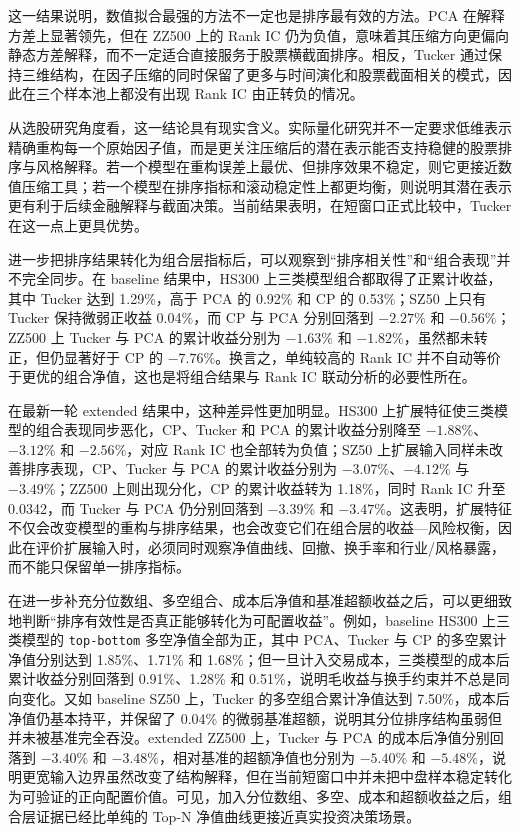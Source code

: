 这一结果说明，数值拟合最强的方法不一定也是排序最有效的方法。PCA 在解释方差上显著领先，但在 ZZ500 上的 Rank IC 仍为负值，意味着其压缩方向更偏向静态方差解释，而不一定适合直接服务于股票横截面排序。相反，Tucker 通过保持三维结构，在因子压缩的同时保留了更多与时间演化和股票截面相关的模式，因此在三个样本池上都没有出现 Rank IC 由正转负的情况。

从选股研究角度看，这一结论具有现实含义。实际量化研究并不一定要求低维表示精确重构每一个原始因子值，而是更关注压缩后的潜在表示能否支持稳健的股票排序与风格解释。若一个模型在重构误差上最优、但排序效果不稳定，则它更接近数值压缩工具；若一个模型在排序指标和滚动稳定性上都更均衡，则说明其潜在表示更有利于后续金融解释与截面决策。当前结果表明，在短窗口正式比较中，Tucker 在这一点上更具优势。

进一步把排序结果转化为组合层指标后，可以观察到“排序相关性”和“组合表现”并不完全同步。在 baseline 结果中，HS300 上三类模型组合都取得了正累计收益，其中 Tucker 达到 1.29\%，高于 PCA 的 0.92\% 和 CP 的 0.53\%；SZ50 上只有 Tucker 保持微弱正收益 0.04\%，而 CP 与 PCA 分别回落到 $-2.27\%$ 和 $-0.56\%$；ZZ500 上 Tucker 与 PCA 的累计收益分别为 $-1.63\%$ 和 $-1.82\%$，虽然都未转正，但仍显著好于 CP 的 $-7.76\%$。换言之，单纯较高的 Rank IC 并不自动等价于更优的组合净值，这也是将组合结果与 Rank IC 联动分析的必要性所在。

在最新一轮 extended 结果中，这种差异性更加明显。HS300 上扩展特征使三类模型的组合表现同步恶化，CP、Tucker 和 PCA 的累计收益分别降至 $-1.88\%$、$-3.12\%$ 和 $-2.56\%$，对应 Rank IC 也全部转为负值；SZ50 上扩展输入同样未改善排序表现，CP、Tucker 与 PCA 的累计收益分别为 $-3.07\%$、$-4.12\%$ 与 $-3.49\%$；ZZ500 上则出现分化，CP 的累计收益转为 1.18\%，同时 Rank IC 升至 0.0342，而 Tucker 与 PCA 仍分别回落到 $-3.39\%$ 和 $-3.47\%$。这表明，扩展特征不仅会改变模型的重构与排序结果，也会改变它们在组合层的收益—风险权衡，因此在评价扩展输入时，必须同时观察净值曲线、回撤、换手率和行业/风格暴露，而不能只保留单一排序指标。

在进一步补充分位数组、多空组合、成本后净值和基准超额收益之后，可以更细致地判断“排序有效性是否真正能够转化为可配置收益”。例如，baseline HS300 上三类模型的 \texttt{top-bottom} 多空净值全部为正，其中 PCA、Tucker 与 CP 的多空累计净值分别达到 1.85\%、1.71\% 和 1.68\%；但一旦计入交易成本，三类模型的成本后累计收益分别回落到 0.91\%、1.28\% 和 0.51\%，说明毛收益与换手约束并不总是同向变化。又如 baseline SZ50 上，Tucker 的多空组合累计净值达到 7.50\%，成本后净值仍基本持平，并保留了 0.04\% 的微弱基准超额，说明其分位排序结构虽弱但并未被基准完全吞没。extended ZZ500 上，Tucker 与 PCA 的成本后净值分别回落到 $-3.40\%$ 和 $-3.48\%$，相对基准的超额净值也分别为 $-5.40\%$ 和 $-5.48\%$，说明更宽输入边界虽然改变了结构解释，但在当前短窗口中并未把中盘样本稳定转化为可验证的正向配置价值。可见，加入分位数组、多空、成本和超额收益之后，组合层证据已经比单纯的 Top-N 净值曲线更接近真实投资决策场景。

